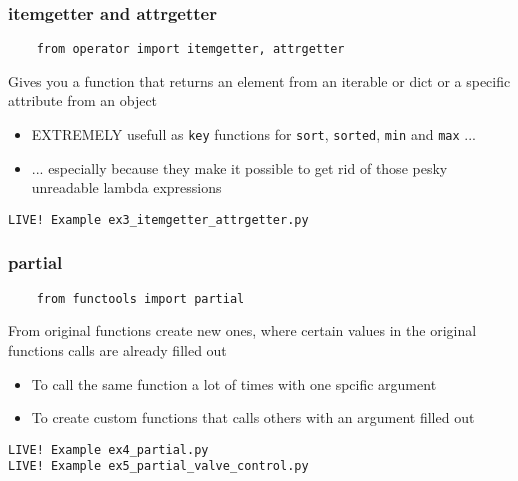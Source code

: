 \documentclass{beamer}
\begin{document}
\begin{frame}[fragile]
  \frametitle{itemgetter and attrgetter}
  \begin{verbatim}
    from operator import itemgetter, attrgetter
  \end{verbatim}
  \begin{block}{\vspace*{-3ex}}
    Gives you a function that returns an element from an iterable or dict
    or a specific attribute from an object
  \end{block}
  \begin{itemize}
  \item {\color{darkred}EXTREMELY} usefull as \texttt{key} functions for
    \texttt{sort}, \texttt{sorted}, \texttt{min} and \texttt{max} ...
  \item ... especially because they make it possible to get rid of
    those pesky unreadable lambda expressions
  \end{itemize}
  \begin{center}
    \texttt{LIVE! Example ex3\_itemgetter\_attrgetter.py}
  \end{center}
\end{frame}

\begin{frame}[fragile]
  \frametitle{partial}
  \begin{verbatim}
    from functools import partial
  \end{verbatim}
  \begin{block}{\vspace*{-3ex}}
    From original functions create new ones, where certain values in
    the original functions calls are already filled out
  \end{block}
  \begin{itemize}
  \item To call the same function a lot of times with one spcific
    argument
  \item To create custom functions that calls others with an argument
    filled out
  \end{itemize}
  \begin{center}
    \texttt{LIVE! Example ex4\_partial.py}\\
    \texttt{LIVE! Example ex5\_partial\_valve\_control.py}
  \end{center}
\end{frame}
\end{document}
